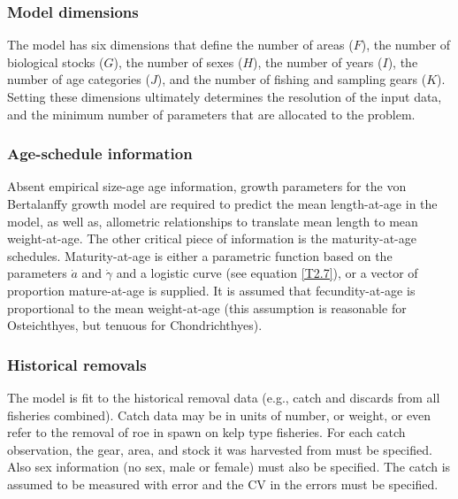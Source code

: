    \subsubsection{Model dimensions} %
    \label{ssub:model_dimensions}
        The model has six dimensions that define the number of areas ($F$), the number of biological stocks ($G$), the number of sexes ($H$), the number of years ($I$), the number of age categories ($J$), and the number of fishing and sampling gears ($K$).  Setting these dimensions ultimately determines the resolution of the input data, and the minimum number of parameters that are allocated to the problem.
    \subsubsection{Age-schedule information} %
    \label{ssub:age_schedule_information}
        Absent empirical size-age age information, growth parameters for the von Bertalanffy growth model are required to predict the mean length-at-age in the model, as well as, allometric relationships to translate mean length to mean weight-at-age.  The other critical piece of information is the maturity-at-age schedules.  Maturity-at-age is either a parametric function based on the parameters $\dot{a}$ and $\dot{\gamma}$ and a logistic curve (see equation \ref{T2.7}), or a vector of proportion mature-at-age is supplied.  It is assumed that fecundity-at-age is proportional to the mean weight-at-age (this assumption is reasonable for Osteichthyes, but tenuous for Chondrichthyes).
    \subsubsection{Historical removals} %
    \label{ssub:historical_removals}
        The model is fit to the historical removal data (e.g., catch and discards from all fisheries combined).  Catch data may be in units of number, or weight, or even refer to the removal of  roe in spawn on kelp type fisheries.  For each catch observation, the gear, area, and stock it was harvested from must be specified.  Also sex information (no sex, male or female) must also be specified.  The catch is assumed to be measured with error and the CV in the errors must be specified.


